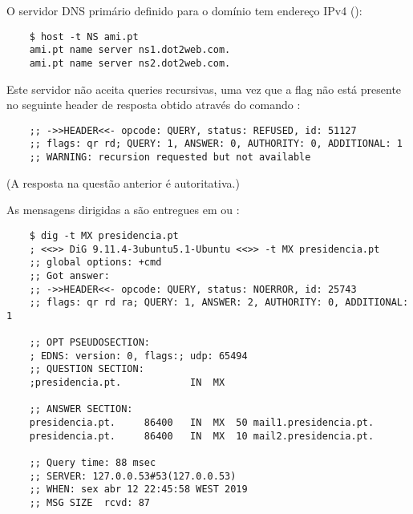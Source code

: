 
\noindent O servidor DNS primário definido para o domínio  tem endereço IPv4  ():

\begin{verbatim}
    $ host -t NS ami.pt
    ami.pt name server ns1.dot2web.com.
    ami.pt name server ns2.dot2web.com.
\end{verbatim}

Este servidor não aceita queries recursivas, uma vez que a flag  não está presente no seguinte header de resposta obtido através do comando :

\begin{verbatim}
    ;; ->>HEADER<<- opcode: QUERY, status: REFUSED, id: 51127
    ;; flags: qr rd; QUERY: 1, ANSWER: 0, AUTHORITY: 0, ADDITIONAL: 1
    ;; WARNING: recursion requested but not available
\end{verbatim}



(A resposta na questão anterior é autoritativa.)



\noindent As mensagens dirigidas a  são entregues em  ou :

\begin{verbatim}
    $ dig -t MX presidencia.pt
    ; <<>> DiG 9.11.4-3ubuntu5.1-Ubuntu <<>> -t MX presidencia.pt
    ;; global options: +cmd
    ;; Got answer:
    ;; ->>HEADER<<- opcode: QUERY, status: NOERROR, id: 25743
    ;; flags: qr rd ra; QUERY: 1, ANSWER: 2, AUTHORITY: 0, ADDITIONAL: 1
    
    ;; OPT PSEUDOSECTION:
    ; EDNS: version: 0, flags:; udp: 65494
    ;; QUESTION SECTION:
    ;presidencia.pt.			IN	MX
    
    ;; ANSWER SECTION:
    presidencia.pt.		86400	IN	MX	50 mail1.presidencia.pt.
    presidencia.pt.		86400	IN	MX	10 mail2.presidencia.pt.
    
    ;; Query time: 88 msec
    ;; SERVER: 127.0.0.53#53(127.0.0.53)
    ;; WHEN: sex abr 12 22:45:58 WEST 2019
    ;; MSG SIZE  rcvd: 87
\end{verbatim}

